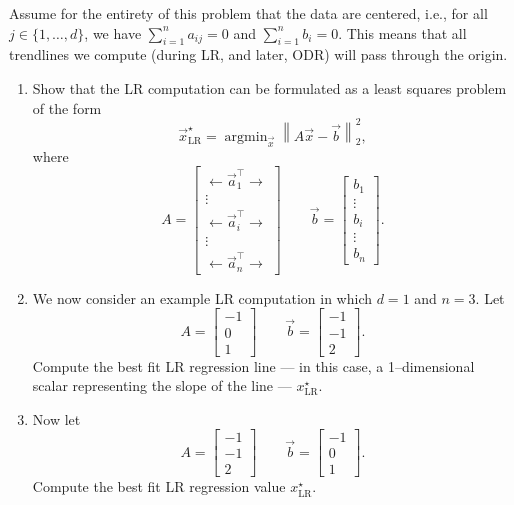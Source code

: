 \documentclass[10pt]{article}
\DeclareMathOperator*{\argmin}{argmin}
\begin{document}
Assume for the entirety of this problem that the data are centered, i.e., for all $j \in \{1, \ldots, d\}$, we have $\sum_{i=1}^{n} a_{ij} = 0$ and $\sum_{i=1}^{n} b_i = 0$. This means that all trendlines we compute (during LR, and later, ODR) will pass through the origin.

\begin{enumerate}[label=(\alph*)]
\item Show that the LR computation can be formulated as a least squares problem of the form
\begin{equation}
\vec{x}^\star_{\text{LR}} = \argmin_{\vec{x}} \left\| A\vec{x} - \vec{b} \right\|_2^2,
\end{equation}
where
\begin{equation}
A = \begin{bmatrix} \leftarrow \vec{a}_1^\top \rightarrow \\ \vdots \\ \leftarrow \vec{a}_i^\top \rightarrow \\ \vdots \\ \leftarrow \vec{a}_n^\top \rightarrow \end{bmatrix} \qquad \vec{b} = \begin{bmatrix} b_1 \\ \vdots \\ b_i \\ \vdots \\ b_n \end{bmatrix}.
\end{equation}

\item We now consider an example LR computation in which $d = 1$ and $n = 3$. Let
\begin{equation}
A = \begin{bmatrix} -1 \\ 0 \\ 1 \end{bmatrix} \qquad \vec{b} = \begin{bmatrix} -1 \\ -1 \\ 2 \end{bmatrix}.
\end{equation}
Compute the best fit LR regression line --- in this case, a 1--dimensional scalar representing the slope of the line --- $x^\star_{\text{LR}}$.

\item Now let
\begin{equation}
A = \begin{bmatrix} -1 \\ -1 \\ 2 \end{bmatrix} \qquad \vec{b} = \begin{bmatrix} -1 \\ 0 \\ 1 \end{bmatrix}.
\end{equation}
Compute the best fit LR regression value $x^\star_{\text{LR}}$.


\end{enumerate}
\end{document}
